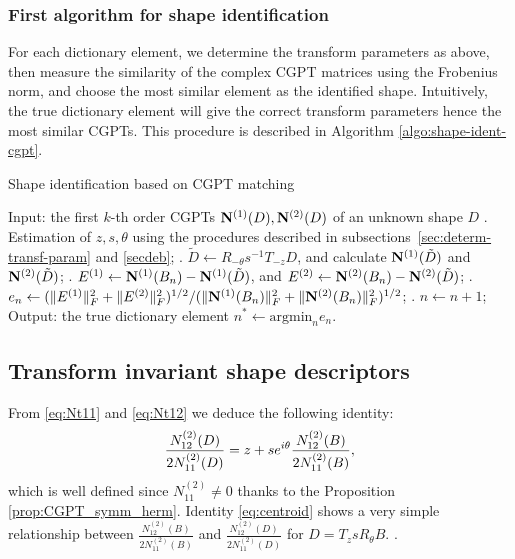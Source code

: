 \subsubsection{First algorithm for shape identification}\label{sec:first-algor-shape}
For each dictionary element, we determine the transform parameters
as above, then measure the similarity of the complex CGPT matrices
using the Frobenius norm, and choose the most similar element as
the identified shape. Intuitively, the true dictionary element
will give the correct transform parameters hence the most similar
CGPTs. This procedure is described in Algorithm
\ref{algo:shape-ident-cgpt}.

\begin{algorithm}
  \caption{Shape identification based on CGPT matching}
  \label{algo:shape-ident-cgpt}
  \begin{algorithmic}
    \STATE Input: the first $k$-th order CGPTs $\mathbf{N}^{(1)}(D), \mathbf{N}^{(2)}(D)$ of an unknown shape $D$
    . Estimation of $z, s, \theta$ using the procedures described in
    subsections~\ref{sec:determ-transf-param} and \ref{secdeb};
    . $\tilde D \leftarrow R_{-\theta}s^{-1}T_{-z}D$, and calculate $\mathbf{N}^{(1)}(\tilde D)$ and  $\mathbf{N}^{(2)}(\tilde
    D)$;
    . $E^{(1)}\leftarrow \mathbf{N}^{(1)}(B_n) - \mathbf{N}^{(1)}(\tilde D)$, and $E^{(2)}\leftarrow \mathbf{N}^{(2)}(B_n) - \mathbf{N}^{(2)}(\tilde
    D)$;
    .
    $e_n\leftarrow (\mathopen\| E^{(1)} \mathclose\|_F^2 + \mathopen\| E^{(2)} \mathclose\|_F^2)^{1/2}/
    (\mathopen\| \mathbf{N}^{(1)}(B_n) \mathclose\|_F^2 + \mathopen\| \mathbf{N}^{(2)}(B_n) \mathclose\|_F^2)^{1/2}$;
    . $n\leftarrow n+1$;
    \ENDFOR
    \STATE Output: the true dictionary element $n^*\leftarrow \mbox{argmin}_n
    e_n$.
  \end{algorithmic}
\end{algorithm}

\subsection{Transform invariant shape descriptors}
\label{sec:transf-invar-shape} From \eqref{eq:Nt11} and
\eqref{eq:Nt12} we deduce the following identity:
\begin{align}
  \frac{N_{12}^{(2)}(D)}{2N_{11}^{(2)}(D)} = z +
  se^{i\theta}\frac{N_{12}^{(2)}(B)}{2N_{11}^{(2)}(B)}, \label{eq:centroid}
\end{align}
which is well defined since $N_{11}^{(2)}\neq 0$ thanks to the
Proposition \ref{prop:CGPT_symm_herm}. Identity
\eqref{eq:centroid} shows a very simple relationship between
$\frac{N_{12}^{(2)}(B)}{2N_{11}^{(2)}(B)}$ and
$\frac{N_{12}^{(2)}(D)}{2N_{11}^{(2)}(D)}$ for $D= T_z s R_\theta B$. .

